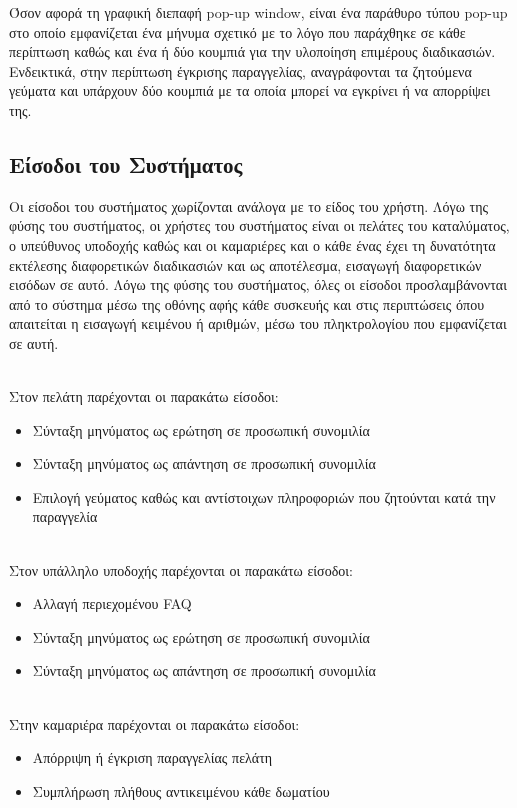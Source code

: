 \noindent
Όσον αφορά τη γραφική διεπαφή pop-up window, είναι ένα παράθυρο τύπου pop-up στο οποίο εμφανίζεται
ένα μήνυμα σχετικό με το λόγο που παράχθηκε σε κάθε περίπτωση καθώς και ένα ή δύο κουμπιά για την 
υλοποίηση επιμέρους διαδικασιών. Ενδεικτικά, στην περίπτωση έγκρισης παραγγελίας, αναγράφονται τα 
ζητούμενα γεύματα και υπάρχουν δύο κουμπιά με τα οποία μπορεί να εγκρίνει ή να απορρίψει της. 


\subsection{Είσοδοι του Συστήματος}
Οι είσοδοι του συστήματος χωρίζονται ανάλογα με το είδος του χρήστη. Λόγω της φύσης του 
συστήματος, οι χρήστες του συστήματος είναι οι πελάτες του καταλύματος, ο υπεύθυνος υποδοχής 
καθώς και οι καμαριέρες και ο κάθε ένας έχει τη δυνατότητα εκτέλεσης διαφορετικών διαδικασιών και ως
αποτέλεσμα, εισαγωγή διαφορετικών εισόδων σε αυτό.  Λόγω της φύσης του συστήματος, όλες οι 
είσοδοι προσλαμβάνονται από το σύστημα μέσω της οθόνης αφής κάθε συσκευής και στις περιπτώσεις
όπου απαιτείται η εισαγωγή κειμένου ή αριθμών, μέσω του πληκτρολογίου που εμφανίζεται σε αυτή.

\noindent \\ 
Στον πελάτη παρέχονται οι παρακάτω είσοδοι:
\begin{itemize}
	\item Σύνταξη μηνύματος ως ερώτηση σε προσωπική συνομιλία
	\item Σύνταξη μηνύματος ως απάντηση σε προσωπική συνομιλία
	\item Επιλογή γεύματος καθώς και αντίστοιχων πληροφοριών που ζητούνται κατά την παραγγελία
\end{itemize}

\noindent \\ 
Στον υπάλληλο υποδοχής παρέχονται οι παρακάτω είσοδοι:
\begin{itemize}
	\item Αλλαγή περιεχομένου FAQ
	\item Σύνταξη μηνύματος ως ερώτηση σε προσωπική συνομιλία
	\item Σύνταξη μηνύματος ως απάντηση σε προσωπική συνομιλία 
\end{itemize}

\noindent \\ 
Στην καμαριέρα παρέχονται οι παρακάτω είσοδοι:
\begin{itemize}
	\item Απόρριψη ή έγκριση παραγγελίας πελάτη
	\item Συμπλήρωση πλήθους αντικειμένου κάθε δωματίου
\end{itemize}


